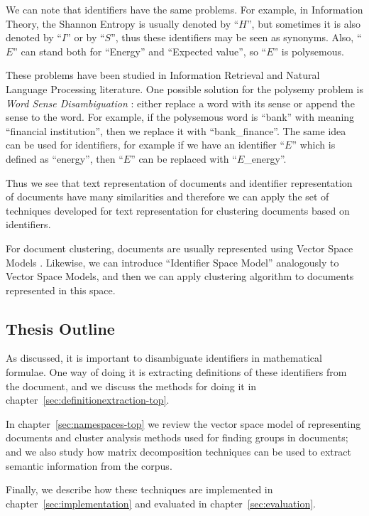 We can note that identifiers have the same problems. For example,
in Information Theory, the Shannon Entropy is usually denoted by
``$H$'', but sometimes it is also denoted by ``$I$'' or by ``$S$'',
thus these identifiers may be seen as synonyms.
Also, ``$E$'' can stand both for ``Energy'' and ``Expected value'',
so ``$E$'' is polysemous.

These problems have been studied in Information Retrieval and
Natural Language Processing literature.
One possible solution for the polysemy problem is \emph{Word Sense Disambiguation}
\cite{jurafsky2000speech}: either replace a word with its sense
\cite{stokoe2003word} or append the sense to the word. For example,
if the polysemous word is ``bank'' with meaning ``financial institution'',
then we replace it with ``bank\_finance''. The same idea can be used
for identifiers, for example if we have an identifier ``$E$'' which is
defined as ``energy'', then ``$E$'' can be replaced with ``$E$\_energy''.

Thus we see that text representation of documents and identifier representation
of documents have many similarities and therefore we can apply the set of
techniques developed for text representation for clustering documents based
on identifiers.

For document clustering, documents are usually represented using
Vector Space Models \cite{oikonomakou2005review} \cite{aggarwal2012survey}.
Likewise, we can introduce ``Identifier Space Model'' analogously to
Vector Space Models, and then we can apply clustering algorithm 
to documents represented in this space. 


\subsection{Thesis Outline}

As discussed, it is important to disambiguate identifiers in mathematical 
formulae. One way of doing it is extracting definitions of these identifiers 
from the document, and we discuss the methods for doing it in chapter~\ref{sec:definitionextraction-top}.

In chapter~\ref{sec:namespaces-top} we review the vector space model of 
representing documents and cluster analysis methods used for finding 
groups in documents; and we also study how matrix decomposition 
techniques  can be used to extract semantic information from the corpus. 

Finally, we describe how these techniques are implemented in 
chapter~\ref{sec:implementation} and evaluated in chapter~\ref{sec:evaluation}.

